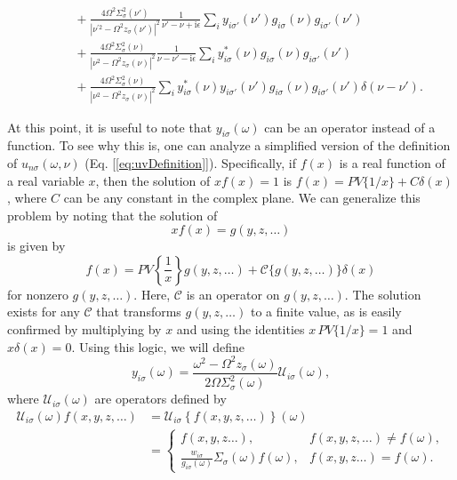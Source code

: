 \begin{equation}
\begin{split}
&\qquad + \frac{4\Omega^2\Sigma_\sigma^2(\nu')}{|\nu^{\prime2} - \Omega^2z_\sigma(\nu')|^2}\frac{1}{\nu' - \nu  + \mathrm{i}\epsilon}\sum_{i}y_{i\sigma'}(\nu')g_{i\sigma}(\nu)g_{i\sigma'}(\nu')\\
&\qquad + \frac{4\Omega^2\Sigma_\sigma^2(\nu )}{|\nu ^2 - \Omega^2z_\sigma(\nu )|^2}\frac{1}{\nu  - \nu' - \mathrm{i}\epsilon}\sum_{i}y_{i\sigma}^*(\nu )g_{i\sigma}(\nu)g_{i\sigma'}(\nu')\\
&\qquad + \frac{4\Omega^2\Sigma_\sigma^2(\nu )}{|\nu^2 - \Omega^2z_\sigma(\nu )|^2}\sum_{i}y^*_{i\sigma}(\nu )y_{i\sigma'}(\nu')g_{i\sigma}(\nu)g_{i\sigma'}(\nu')\delta(\nu  - \nu').
\end{split}
\end{equation}

At this point, it is useful to note that $y_{i\sigma}(\omega)$ can be an operator instead of a function. To see why this is, one can analyze a simplified version of the definition of $u_{n\sigma}(\omega,\nu)$ (Eq. [\ref{eq:uvDefinition}]). Specifically, if $f(x)$ is a real function of a real variable $x$, then the solution of $xf(x) = 1$ is $f(x) = PV\{1/x\} + C\delta(x)$, where $C$ can be any constant in the complex plane. We can generalize this problem by noting that the solution of
\begin{equation}
xf(x) = g(y,z,\ldots)
\end{equation}
is given by
\begin{equation}
f(x) = PV\left\{\frac{1}{x}\right\}g(y,z,\ldots) + \mathcal{C}\{g(y,z,\ldots)\}\delta(x)
\end{equation}
for nonzero $g(y,z,\ldots)$. Here, $\mathcal{C}$ is an operator on $g(y,z,\ldots)$. The solution exists for any $\mathcal{C}$ that transforms $g(y,z,\ldots)$ to a finite value, as is easily confirmed by multiplying by $x$ and using the identities $x\,PV\{1/x\} = 1$ and $x\delta(x) = 0$. Using this logic, we will define
\begin{equation}
y_{i\sigma}(\omega) = \frac{\omega^2 - \Omega^2z_\sigma(\omega)}{2\Omega\Sigma_\sigma^2(\omega)}\mathcal{U}_{i\sigma}(\omega),
\end{equation}
where $\mathcal{U}_{i\sigma}(\omega)$ are operators defined by
\begin{equation}
\begin{split}
\mathcal{U}_{i\sigma}(\omega)f(x,y,z,\ldots) &= \mathcal{U}_{i\sigma}\left\{f(x,y,z,\ldots)\right\}(\omega)\\
&= 
\begin{cases}
f(x,y,z\ldots), & f(x,y,z,\ldots) \neq f(\omega),\\
\frac{w_{i\sigma}}{g_{i\sigma}(\omega)}\Sigma_\sigma(\omega)f(\omega), & f(x,y,z\ldots) = f(\omega). 
\end{cases}
\end{split}
\end{equation}
